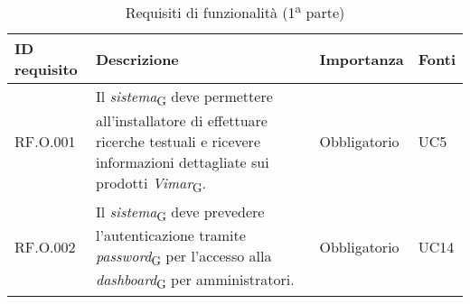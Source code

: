 \begin{table}[H]
\centering
    \begin{tabular}{|C{2.7cm}|L{6.5cm}|C{2.7cm}|C{2.7cm}|}
        \hline
        \textbf{ID requisito} & \textbf{Descrizione} & \textbf{Importanza} & \textbf{Fonti}  \\
        \hline
        RF.O.001 & Il \textit{sistema}\textsubscript{G} deve permettere all'installatore di effettuare ricerche testuali e ricevere informazioni dettagliate sui prodotti \textit{Vimar}\textsubscript{G}. & Obbligatorio & UC5 \\
        \hline
        RF.O.002 & Il \textit{sistema}\textsubscript{G} deve prevedere l'autenticazione tramite \textit{password}\textsubscript{G} per l'accesso alla \textit{dashboard}\textsubscript{G} per amministratori. & Obbligatorio & UC14 \\
        \hline
    \end{tabular}
    \caption{Requisiti di funzionalità (1\textsuperscript{a}  parte)}
\end{table}
